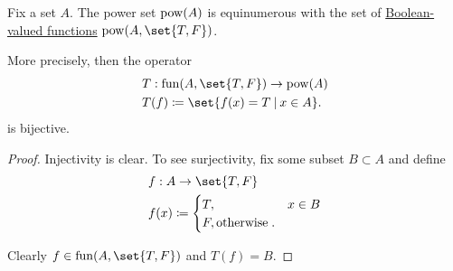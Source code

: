 \begin{lemma}\label{thm:power_set_via_subsets}
  Fix a set \( A \). The power set \( \operatorname{pow}(A) \) is equinumerous with the set of \hyperref[def:boolean_function]{Boolean-valued functions} \( \pow(A, \set{ T, F }) \).

  More precisely, then the operator
  \begin{equation*}
    \begin{aligned}
      &T: \fun(A, \set{ T, F }) \to \pow(A) \\
      &T(f) \coloneqq \set{ f(x) = T \given x \in A }.
    \end{aligned}
  \end{equation*}
  is bijective.
\end{lemma}
\begin{proof}
  Injectivity is clear. To see surjectivity, fix some subset \( B \subset A \) and define
  \begin{equation*}
    \begin{aligned}
      &f: A \to \set{ T, F } \\
      &f(x) \coloneqq \begin{cases}
        T, &x \in B \\
        F, \T{otherwise}.
      \end{cases}
    \end{aligned}
  \end{equation*}

  Clearly \( f \in \fun(A, \set{ T, F }) \) and \( T(f) = B \).
\end{proof}

